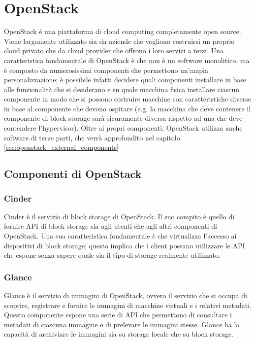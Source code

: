 \section{OpenStack}

OpenStack è una piattaforma di cloud computing completamente open source. Viene largamente utilizzato sia da aziende che vogliono costruirsi un proprio cloud privato che da cloud provider che offrono i loro servizi a terzi.
Una caratteristica fondamentale di OpenStack è che non è un software monolitico, ma è composto da numerosissimi componenti che permettono un'ampia personalizzazione; è possibile infatti decidere quali componenti installare in base alle funzionalità che si desiderano e su quale macchina fisica installare ciascun componente in modo che si possono costruire macchine con caratteristiche diverse in base al componente che devono ospitare (e.g. la macchina che deve contenere il componente di block storage sarà sicuramente diversa rispetto ad una che deve contendere l'hypervisor).
Oltre ai propri componenti, OpenStack utilizza anche software di terze parti, che verrà approfondito nel capitolo \ref{sec:openstack_external_components}

\subsection{Componenti di OpenStack}

\subsubsection{Cinder}\label{sec:openstack_cinder}
Cinder è il servizio di block storage di OpenStack. Il suo compito è quello di fornire API di block storage sia agli utenti che agli altri componenti di OpenStack. Una sua caratteristica fondamentale è che virtualizza l'accesso ai dispositivi di block storage; questo implica che i client possano utilizzare le API che espone senza sapere quale sia il tipo di storage realmente utilizzato.

\subsubsection{Glance}\label{sec:openstack_glance}
Glance è il servizio di immagini di OpenStack, ovvero il servizio che si occupa di scoprire, registrare e fornire le immagini di macchine virtuali e i relativi metadati. Questo componente espone una serie di API che permettono di consultare i metadati di ciascuna immagine e di prelevare le immagini stesse. Glance ha la capacità di archiviare le immagini sia su storage locale che su block storage.

